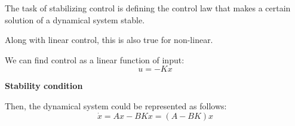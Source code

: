 
\begin{tcolorbox}[colback=green!10,colframe=green!50!black,title=\textbf{Dynamical systems}]
    The task of stabilizing control is defining the control law that makes a certain solution of 
    a dynamical system stable.
\end{tcolorbox}

Along with linear control, this is also true for non-linear. 

We can find control as a linear function of input:
\[u = - Kx\]

\textbf{Stability condition}


Then, the dynamical system could be represented as follows:
\[\dot x = Ax - BKx = (A-BK)x\]